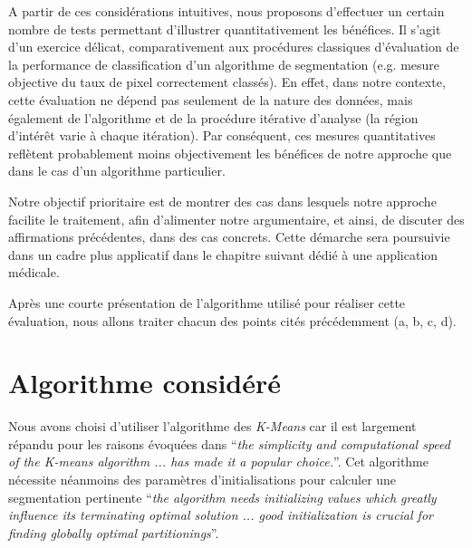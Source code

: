 	A partir de ces considérations intuitives, nous proposons d'effectuer un certain nombre de tests permettant d'illustrer quantitativement les bénéfices. Il s'agit d'un exercice délicat, comparativement aux procédures classiques d'évaluation de la performance de classification d'un algorithme de segmentation (e.g. mesure objective du taux de pixel correctement classés). En effet, dans notre contexte, cette évaluation ne dépend pas seulement de la nature des données, mais également de l'algorithme et de la procédure itérative d'analyse (la région d'intérêt varie à chaque itération). Par conséquent, ces mesures quantitatives reflètent probablement moins objectivement les bénéfices de notre approche que dans le cas d'un algorithme particulier. 

	Notre objectif prioritaire est de montrer des cas dans lesquels notre approche facilite le traitement, afin d'alimenter notre argumentaire, et ainsi, de discuter des affirmations précédentes, dans des cas concrets. Cette démarche sera poursuivie dans un cadre plus applicatif dans le chapitre suivant dédié à une application médicale.

	Après une courte présentation de l'algorithme utilisé pour réaliser cette évaluation, nous allons traiter chacun des points cités précédemment (a, b, c, d).

	\section{Algorithme considéré}
Nous avons choisi d'utiliser l'algorithme des \emph{K-Means} car il est largement répandu pour les raisons évoquées dans \citep[Ranjan]{Ranjan2010} ``\textit{the simplicity and computational speed of the K-means algorithm ... has made it a popular choice.}''. Cet algorithme nécessite néanmoins des paramètres d'initialisations pour calculer une segmentation pertinente \citep[Ranjan]{Ranjan2010} ``\textit{the algorithm needs initializing values which greatly influence its terminating optimal solution ... good initialization is crucial for finding globally optimal partitionings}''. 
		
